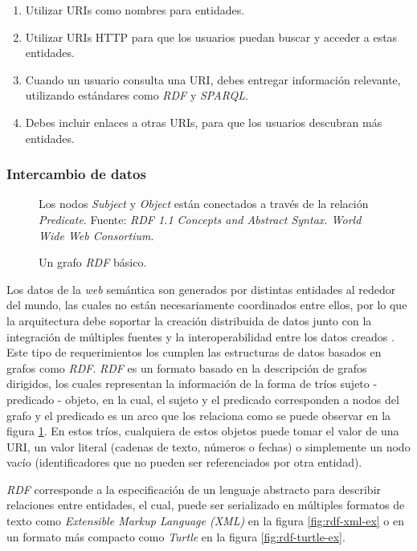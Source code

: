 \begin{enumerate}
    \item Utilizar URIs como nombres para entidades.
    \item Utilizar URIs HTTP para que los usuarios puedan buscar y acceder a
    estas entidades.
    \item Cuando un usuario consulta una URI, debes entregar información
    relevante, utilizando estándares como \textit{RDF} y \textit{SPARQL}.
    \item Debes incluir enlaces a otras URIs, para que los usuarios descubran
    más entidades.
\end{enumerate}

\subsubsection{Intercambio de datos}
\label{sec:intercambio-datos}

\begin{figure}
    \centering
    
    \caption{Un grafo \textit{RDF} básico.} Los nodos \textit{Subject} y
    \textit{Object} están conectados a través de la relación \textit{Predicate}.
    Fuente: \textit{RDF 1.1 Concepts and Abstract Syntax. World Wide Web
    Consortium}.
    \label{fig:rdf-graph1}
\end{figure}

Los datos de la \textit{web} semántica son generados por distintas entidades al
rededor del mundo, las cuales no están necesariamente coordinados entre ellos,
por lo que la arquitectura debe soportar la creación distribuida de datos junto
con la integración de múltiples fuentes y la interoperabilidad entre los datos
creados \cite{bizer2011linked}. Este tipo de requerimientos los cumplen las
estructuras de datos basados en grafos como \textit{RDF}. \textit{RDF} es un
formato basado en la descripción de grafos dirigidos, los cuales representan la
información de la forma de tríos sujeto - predicado - objeto, en la cual, el
sujeto y el predicado corresponden a nodos del grafo y el predicado es un arco
que los relaciona como se puede observar en la figura \ref{fig:rdf-graph1}. En
estos tríos, cualquiera de estos objetos puede tomar el valor de una URI, un
valor literal (cadenas de texto, números o fechas) o simplemente un nodo vacío
(identificadores que no pueden ser referenciados por otra entidad).

\textit{RDF} corresponde a la especificación de un lenguaje abstracto para
describir relaciones entre entidades, el cual, puede ser serializado en
múltiples formatos de texto como \textit{Extensible Markup Language (XML)}
\cite{beckett2004rdf} en la figura \ref{fig:rdf-xml-ex} o en un formato más
compacto como \textit{Turtle} \cite{beckett2014rdf} en la figura
\ref{fig:rdf-turtle-ex}.

